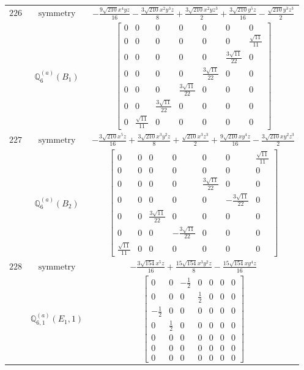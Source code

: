 \documentclass[fleqn,8pt,landscape]{jsarticle}
\begin{document}
\begin{longtable}{ccc}
$ 226 $ & $ \text{symmetry} $ & $ - \frac{9 \sqrt{210} x^{4} y z}{16} - \frac{3 \sqrt{210} x^{2} y^{3} z}{8} + \frac{3 \sqrt{210} x^{2} y z^{3}}{2} + \frac{3 \sqrt{210} y^{5} z}{16} - \frac{\sqrt{210} y^{3} z^{3}}{2} $ \\
$  $ & $ \mathbb{Q}_{6}^{(a)}(B_{1}) $ & $ \begin{bmatrix} 0 & 0 & 0 & 0 & 0 & 0 & 0 \\ 0 & 0 & 0 & 0 & 0 & 0 & \frac{\sqrt{11}}{11} \\ 0 & 0 & 0 & 0 & 0 & \frac{3 \sqrt{11}}{22} & 0 \\ 0 & 0 & 0 & 0 & \frac{3 \sqrt{11}}{22} & 0 & 0 \\ 0 & 0 & 0 & \frac{3 \sqrt{11}}{22} & 0 & 0 & 0 \\ 0 & 0 & \frac{3 \sqrt{11}}{22} & 0 & 0 & 0 & 0 \\ 0 & \frac{\sqrt{11}}{11} & 0 & 0 & 0 & 0 & 0 \end{bmatrix} $ \\ \hline
$ 227 $ & $ \text{symmetry} $ & $ - \frac{3 \sqrt{210} x^{5} z}{16} + \frac{3 \sqrt{210} x^{3} y^{2} z}{8} + \frac{\sqrt{210} x^{3} z^{3}}{2} + \frac{9 \sqrt{210} x y^{4} z}{16} - \frac{3 \sqrt{210} x y^{2} z^{3}}{2} $ \\
$  $ & $ \mathbb{Q}_{6}^{(a)}(B_{2}) $ & $ \begin{bmatrix} 0 & 0 & 0 & 0 & 0 & 0 & \frac{\sqrt{11}}{11} \\ 0 & 0 & 0 & 0 & 0 & 0 & 0 \\ 0 & 0 & 0 & 0 & \frac{3 \sqrt{11}}{22} & 0 & 0 \\ 0 & 0 & 0 & 0 & 0 & - \frac{3 \sqrt{11}}{22} & 0 \\ 0 & 0 & \frac{3 \sqrt{11}}{22} & 0 & 0 & 0 & 0 \\ 0 & 0 & 0 & - \frac{3 \sqrt{11}}{22} & 0 & 0 & 0 \\ \frac{\sqrt{11}}{11} & 0 & 0 & 0 & 0 & 0 & 0 \end{bmatrix} $ \\ \hline
$ 228 $ & $ \text{symmetry} $ & $ - \frac{3 \sqrt{154} x^{5} z}{16} + \frac{15 \sqrt{154} x^{3} y^{2} z}{8} - \frac{15 \sqrt{154} x y^{4} z}{16} $ \\
$  $ & $ \mathbb{Q}_{6,1}^{(a)}(E_{1},1) $ & $ \begin{bmatrix} 0 & 0 & - \frac{1}{2} & 0 & 0 & 0 & 0 \\ 0 & 0 & 0 & \frac{1}{2} & 0 & 0 & 0 \\ - \frac{1}{2} & 0 & 0 & 0 & 0 & 0 & 0 \\ 0 & \frac{1}{2} & 0 & 0 & 0 & 0 & 0 \\ 0 & 0 & 0 & 0 & 0 & 0 & 0 \\ 0 & 0 & 0 & 0 & 0 & 0 & 0 \\ 0 & 0 & 0 & 0 & 0 & 0 & 0 \end{bmatrix} $ \\ \hline

\end{longtable}
\end{document}
